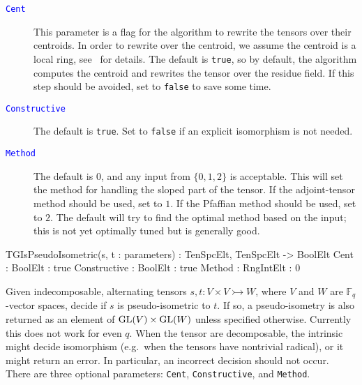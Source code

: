 \documentclass{documentation}
\DeclareMathOperator{\GL}{{\rm GL}}
\begin{document}
\begin{description}
\item[\textcolor{blue}{\tt Cent}]
This parameter is a flag for the algorithm to rewrite the tensors over their centroids. In order to rewrite over the centroid, we assume the centroid is a local ring, see~\cite{TensorSpacePackage} for details. The default is \texttt{true}, so by default, the algorithm computes the centroid and rewrites the tensor over the residue field.
If this step should be avoided, set to \texttt{false} to save some time.
\item[\textcolor{blue}{\tt Constructive}]
The default is \texttt{true}. 
Set to \texttt{false} if an explicit isomorphism is not needed.
\item[\textcolor{blue}{\tt Method}]
The default is $0$, and any input from $\{ 0,1,2\}$ is acceptable. 
This will set the method for handling the sloped part of the tensor.
If the adjoint-tensor method should be used, set to $1$. If the Pfaffian method should be used, set to $2$. The default will try to find the optimal method based on the input; this is not yet optimally tuned but is generally good.
\end{description}

\begin{intrinsics}
TGIsPseudoIsometric(s, t : parameters) : TenSpcElt, TenSpcElt -> BoolElt
    Cent : BoolElt : true
    Constructive : BoolElt : true
    Method : RngIntElt : 0
\end{intrinsics}

\color{black}
Given indecomposable, alternating tensors $s, t : V\times V \rightarrowtail W$, where $V$ and $W$ are $\mathbb{F}_q$-vector spaces, decide if $s$ is pseudo-isometric to $t$.
If so, a pseudo-isometry is also returned as an element of $\GL(V)\times \GL(W)$ unless specified otherwise. 
Currently this does not work for even $q$. 
When the tensor are decomposable, the intrinsic might decide isomorphism (e.g.\ when the tensors have nontrivial radical), or it might return an error. In particular, an incorrect decision should not occur.  
There are three optional parameters: \texttt{Cent}, \texttt{Constructive}, and \texttt{Method}.
\end{document}
